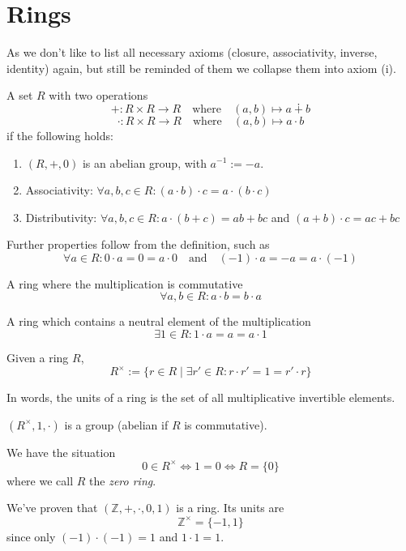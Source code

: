 \section{Rings}
As we don't like to list all necessary axioms (closure, associativity, inverse, identity) again, but still be reminded of them we collapse them into axiom (i).
\begin{definition}[Ring]
   A set \(R\) with two operations
   \[+: R \times R \to R \quad\text{where}\quad (a, b) \mapsto a \dotplus b\]
   \[\cdot: R \times R \to R \quad\text{where}\quad (a, b) \mapsto a \cdot b\]
   if the following holds:
   \begin{enumerate}[label=\roman*, align=Center]
      \item \((R, +, 0)\) is an abelian group, with \(a^{-1} := -a\).
      \item Associativity: \(\forall a, b, c \in R: (a \cdot b) \cdot c = a \cdot (b \cdot c)\)
      \item Distributivity: \(\forall a, b, c \in R: a \cdot (b + c) = ab + bc\) and \((a + b) \cdot c = ac + bc\)
   \end{enumerate}
\end{definition}
\begin{remark}
   Further properties follow from the definition, such as
   \[\forall a \in R: 0 \cdot a = 0 = a \cdot 0 \quad\text{and}\quad (-1) \cdot a = -a = a \cdot (-1)\]
\end{remark}

\begin{definition}
   A ring where the multiplication is commutative
   \[\forall a, b \in R: a \cdot b = b \cdot a\]
\end{definition}

\begin{definition}
   A ring which contains a neutral element of the multiplication
   \[\exists 1 \in R: 1 \cdot a = a = a \cdot 1\]
\end{definition}

\begin{definition}\label{def:units_ring}
   Given a ring \(R\),
   \[R^\times := \{r \in R \mid \exists r' \in R: r \cdot r' = 1 = r' \cdot r\}\]
\end{definition}
\begin{remark}[Intuition]
   In words, the units of a ring is the set of all multiplicative invertible elements.
\end{remark}
\begin{remark}
   \((R^{\times}, 1, \cdot)\) is a group (abelian if \(R\) is commutative).
\end{remark}
\begin{remark}
   We have the situation
   \[0 \in R^\times \iff 1 = 0 \iff R = \{0\}\]
   where we call \(R\) the \emph{zero ring}.
\end{remark}
\begin{example}
   We've proven that \((\mathbb{Z}, +, \cdot, 0, 1)\) is a ring.
   Its units are
   \[\mathbb{Z}^\times = \{-1, 1\}\]
   since only \((-1) \cdot (-1) = 1\) and \(1 \cdot 1 = 1\).
\end{example}

